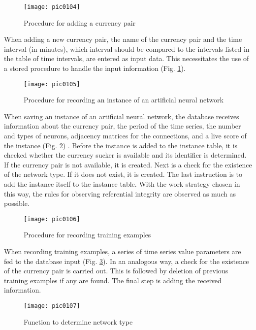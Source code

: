 \begin{figure}[h]
\centering
\texttt{[image: pic0104]}
\caption{Procedure for adding a currency pair}
\label{fig:pic0104}
\end{figure}
\FloatBarrier

When adding a new currency pair, the name of the currency pair and the time interval (in minutes), which interval should be compared to the intervals listed in the table of time intervals, are entered as input data. This necessitates the use of a stored procedure to handle the input information (Fig. \ref{fig:pic0104}).

\begin{figure}[h]
\centering
\texttt{[image: pic0105]}
\caption{Procedure for recording an instance of an artificial neural network}
\label{fig:pic0105}
\end{figure}
\FloatBarrier

When saving an instance of an artificial neural network, the database receives information about the currency pair, the period of the time series, the number and types of neurons, adjacency matrices for the connections, and a live score of the instance (Fig. \ref{fig:pic0105}) . Before the instance is added to the instance table, it is checked whether the currency sucker is available and its identifier is determined. If the currency pair is not available, it is created. Next is a check for the existence of the network type. If it does not exist, it is created. The last instruction is to add the instance itself to the instance table. With the work strategy chosen in this way, the rules for observing referential integrity are observed as much as possible.

\begin{figure}[h]
\centering
\texttt{[image: pic0106]}
\caption{Procedure for recording training examples}
\label{fig:pic0106}
\end{figure}
\FloatBarrier

When recording training examples, a series of time series value parameters are fed to the database input (Fig. \ref{fig:pic0106}). In an analogous way, a check for the existence of the currency pair is carried out. This is followed by deletion of previous training examples if any are found. The final step is adding the received information.

\begin{figure}[h]
\centering
\texttt{[image: pic0107]}
\caption{Function to determine network type}
\label{fig:pic0107}
\end{figure}
\FloatBarrier

